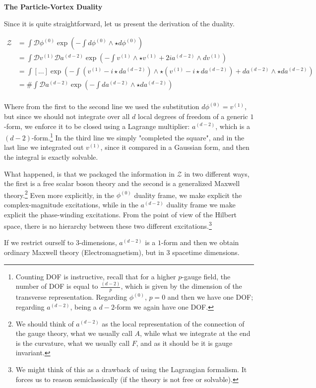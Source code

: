 \documentclass[aps,preprint,nofootinbib,preprintnumbers,eqsecnum,superscriptaddress]{revtex4}
\numberwithin{equation}{section}
\begin{document}
\begin{tcolorbox}
    {\bf The Particle-Vortex Duality}

    Since it is quite straightforward, let us present the derivation of the duality.
    
\begin{align}
    \mathcal{Z} &= \int \mathcal{D}\phi^{(0)} \exp \left( -\int d \phi^{(0)} \wedge \star d \phi^{(0)} \right) \\
    &= \int \mathcal{D}v^{(1)} \mathcal{D}a^{(d-2)} \exp \left( -\int v^{(1)} \wedge \star v^{(1)} + 2ia^{(d-2)} \wedge dv^{(1)} \right) \\
    &= \int [...] \exp \left( -\int (v^{(1)}- i\star da^{(d-2)}) \wedge \star (v^{(1)}- i\star da^{(d-2)}) + da^{(d-2)} \wedge \star da^{(d-2)} \right) \\
    &= \# \int \mathcal{D}a^{(d-2)} \exp \left( -\int  da^{(d-2)} \wedge \star da^{(d-2)} \right) \\
\end{align}

Where from the first to the second line we used the substitution $d\phi^{(0)} = v^{(1)}$, but since we should not integrate over all $d$ local degrees of freedom of a generic $1$-form, we enforce it to be closed using a Lagrange multiplier: $a^{(d-2)}$, which is a $(d-2)$-form.\footnote{Counting DOF is instructive, recall that for a higher $p$-gauge field, the number of DOF is equal to $\frac{(d-2)}{p}$, which is given by the dimension of the transverse representation. Regarding $\phi^{(0)}$, $p=0$ and then we have one DOF; regarding $a^{(d-2)}$, being a $d-2$-form we again have one DOF.} In the third line we simply "completed the square", and in the last line we integrated out $v^{(1)}$, since it compared in a Gaussian form, and then the integral is exactly solvable.

What happened, is that we packaged the information in $\mathcal{Z}$ in two different ways, the first is a free scalar boson theory and the second is a generalized Maxwell theory.\footnote{We should think of $a^{(d-2)}$ as the local representation of the connection of the gauge theory, what we usually call $A$, while what we integrate at the end is the curvature, what we usually call $F$, and as it should be it is gauge invariant.} Even more explicitly, in the $\phi^{(0)}$ duality frame, we make explicit the complex-magnitude excitations, while in the $a^{(d-2)}$ duality frame we make explicit the phase-winding excitations. From the point of view of the Hilbert space, there is no hierarchy between these two different excitations.\footnote{We might think of this as a drawback of using the Lagrangian formalism. It forces us to reason semiclassically (if the theory is not free or solvable).}

If we restrict ourself to $3$-dimensions, $a^{(d-2)}$ is a $1$-form and then we obtain ordinary Maxwell theory (Electromagnetism), but in $3$ spacetime dimensions.
    
\end{tcolorbox}
\end{document}
